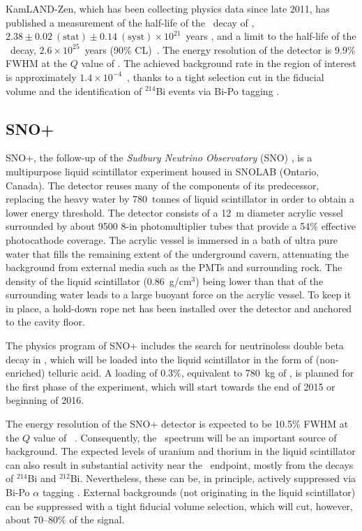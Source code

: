 \documentclass{PoS}
\begin{document}
KamLAND-Zen, which has been collecting physics data since late 2011, has published a measurement of the half-life of the \bbtnu\ decay of \XE, $2.38\pm0.02~(\mathrm{stat})\pm0.14~(\mathrm{syst})\times10^{21}$~years \cite{KamLANDZen:2012aa}, and a limit to the half-life of the \bbonu\ decay, $2.6\times10^{25}$~years (90\% CL)~\cite{Asakura:2014lma, Gando:2012zm}. The energy resolution of the detector is 9.9\% FWHM at the $Q$ value of \XE. The achieved background rate in the region of interest is approximately $1.4\times10^{-4}$~\ckky, thanks to a tight selection cut in the fiducial volume and the identification of $^{214}$Bi events via Bi-Po tagging \cite{Asakura:2014lma}.


\subsection{SNO+} \label{subsec:SNO+}
SNO+, the follow-up of the \emph{Sudbury Neutrino Observatory} (SNO) \cite{Boger:1999bb}, is a multipurpose liquid scintillator experiment housed in SNOLAB (Ontario, Canada). The detector reuses many of the components of its predecessor, replacing the heavy water by 780~tonnes of liquid scintillator in order to obtain a lower energy threshold. The detector consists of a 12~m diameter acrylic vessel surrounded by about 9500 8-in photomultiplier tubes that provide a 54\% effective photocathode coverage. The acrylic vessel is immersed in a bath of ultra pure water that fills the remaining extent of the underground cavern, attenuating the background from external media such as the PMTs and surrounding rock. The density of the liquid scintillator (0.86~g/cm$^{3}$) being lower than that of the surrounding water leads to a large buoyant force on the acrylic vessel. To keep it in place, a hold-down rope net has been installed over the detector and anchored to the cavity floor.

The physics program of SNO+ includes the search for neutrinoless double beta decay in \TE, which will be loaded into the liquid scintillator in the form of (non-enriched) telluric acid. A loading of 0.3\%, equivalent to 780~kg of \TE, is planned for the first phase of the experiment, which will start towards the end of 2015 or beginning of 2016. 

The energy resolution of the SNO+ detector is expected to be 10.5\% FWHM at the $Q$ value of \TE\ \cite{Biller:2014eha}. Consequently, the \bbtnu\ spectrum will be an important source of background. The expected levels of uranium and thorium in the liquid scintillator can also result in substantial activity near the \bbonu\ endpoint, mostly from the decays of $^{214}$Bi and $^{212}$Bi. Nevertheless, these can be, in principle, actively suppressed via Bi-Po $\alpha$ tagging \cite{Biller:2014eha}. External backgrounds (not originating in the liquid scintillator) can be suppressed with a tight fiducial volume selection, which will cut, however, about 70--80\% of the signal. 
\end{document}
